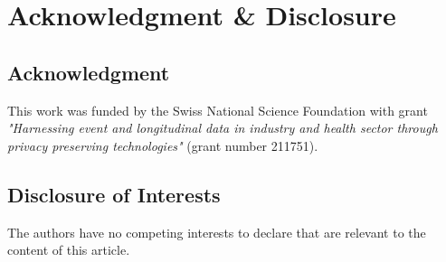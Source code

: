\documentclass{article}
\begin{document}

\section*{Acknowledgment \& Disclosure} 
\subsection*{Acknowledgment} 
This work was funded by the Swiss National Science Foundation with grant \textit{"Harnessing event and longitudinal data in industry and health sector through privacy preserving technologies"} (grant number 211751).

\subsection*{Disclosure of Interests} 
The authors have no competing interests to declare that are relevant to the content of this article. 




\end{document}
